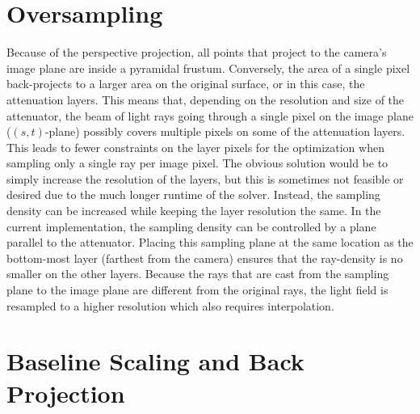 \section{Oversampling}
\label{sec:oversampling}

Because of the perspective projection, all points that project to the camera's image plane are inside a pyramidal frustum.
Conversely, the area of a single pixel back-projects to a larger area on the original surface, or in this case, the attenuation layers.
This means that, depending on the resolution and size of the attenuator, the beam of light rays going through a single pixel on the image plane (\mbox{$(s,t)$-plane}) possibly covers multiple pixels on some of the attenuation layers.
This leads to fewer constraints on the layer pixels for the optimization when sampling only a single ray per image pixel.
The obvious solution would be to simply increase the resolution of the layers, but this is sometimes not feasible or desired due to the much longer runtime of the solver.
Instead, the sampling density can be increased while keeping the layer resolution the same.
In the current implementation, the sampling density can be controlled by a plane parallel to the attenuator.
Placing this sampling plane at the same location as the bottom-most layer (farthest from the camera) ensures that the ray-density is no smaller on the other layers.
Because the rays that are cast from the sampling plane to the image plane are different from the original rays, the light field is resampled to a higher resolution which also requires interpolation.

\section{Baseline Scaling and Back Projection}
\label{sec:baseline_scaling}

